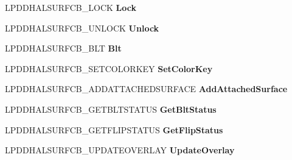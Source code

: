 \begin{DoxyCompactItemize}
L\+P\+D\+D\+H\+A\+L\+S\+U\+R\+F\+C\+B\+\_\+\+L\+O\+CK {\bfseries Lock}
\item 
\mbox{\label{struct___d_d_h_a_l___d_d_s_u_r_f_a_c_e_c_a_l_l_b_a_c_k_s_a39e4f3879910872c9340ce8ab3b7fc88}} 
L\+P\+D\+D\+H\+A\+L\+S\+U\+R\+F\+C\+B\+\_\+\+U\+N\+L\+O\+CK {\bfseries Unlock}
\item 
\mbox{\label{struct___d_d_h_a_l___d_d_s_u_r_f_a_c_e_c_a_l_l_b_a_c_k_s_a46e766d9673e7491d0874a22040a373d}} 
L\+P\+D\+D\+H\+A\+L\+S\+U\+R\+F\+C\+B\+\_\+\+B\+LT {\bfseries Blt}
\item 
\mbox{\label{struct___d_d_h_a_l___d_d_s_u_r_f_a_c_e_c_a_l_l_b_a_c_k_s_ae089606b58c102209509a9151778cb16}} 
L\+P\+D\+D\+H\+A\+L\+S\+U\+R\+F\+C\+B\+\_\+\+S\+E\+T\+C\+O\+L\+O\+R\+K\+EY {\bfseries Set\+Color\+Key}
\item 
\mbox{\label{struct___d_d_h_a_l___d_d_s_u_r_f_a_c_e_c_a_l_l_b_a_c_k_s_a982f44be6a284ac3c549ef94513d2851}} 
L\+P\+D\+D\+H\+A\+L\+S\+U\+R\+F\+C\+B\+\_\+\+A\+D\+D\+A\+T\+T\+A\+C\+H\+E\+D\+S\+U\+R\+F\+A\+CE {\bfseries Add\+Attached\+Surface}
\item 
\mbox{\label{struct___d_d_h_a_l___d_d_s_u_r_f_a_c_e_c_a_l_l_b_a_c_k_s_aadd47d6a1a994dea6e6f4551787644da}} 
L\+P\+D\+D\+H\+A\+L\+S\+U\+R\+F\+C\+B\+\_\+\+G\+E\+T\+B\+L\+T\+S\+T\+A\+T\+US {\bfseries Get\+Blt\+Status}
\item 
\mbox{\label{struct___d_d_h_a_l___d_d_s_u_r_f_a_c_e_c_a_l_l_b_a_c_k_s_a142623d57713348526ea60e76fd39871}} 
L\+P\+D\+D\+H\+A\+L\+S\+U\+R\+F\+C\+B\+\_\+\+G\+E\+T\+F\+L\+I\+P\+S\+T\+A\+T\+US {\bfseries Get\+Flip\+Status}
\item 
\mbox{\label{struct___d_d_h_a_l___d_d_s_u_r_f_a_c_e_c_a_l_l_b_a_c_k_s_a6cc4b3e8cf2624e3b0de8b30c39aeb4f}} 
L\+P\+D\+D\+H\+A\+L\+S\+U\+R\+F\+C\+B\+\_\+\+U\+P\+D\+A\+T\+E\+O\+V\+E\+R\+L\+AY {\bfseries Update\+Overlay}
\item 

\end{DoxyCompactItemize}
